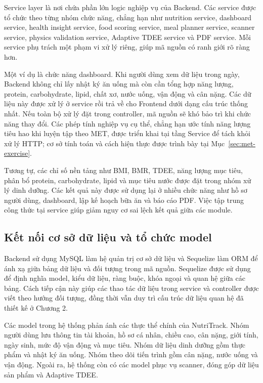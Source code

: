 \documentclass[12pt, a4paper]{report}
\begin{document}
Service layer là nơi chứa phần lớn logic nghiệp vụ của Backend. Các service được tổ chức theo từng nhóm chức năng, chẳng hạn như nutrition service, dashboard service, health insight service, food scoring service, meal planner service, scanner service, physics validation service, Adaptive TDEE service và PDF service. Mỗi service phụ trách một phạm vi xử lý riêng, giúp mã nguồn có ranh giới rõ ràng hơn.

Một ví dụ là chức năng dashboard. Khi người dùng xem dữ liệu trong ngày, Backend không chỉ lấy nhật ký ăn uống mà còn cần tổng hợp năng lượng, protein, carbohydrate, lipid, chất xơ, nước uống, vận động và cân nặng. Các dữ liệu này được xử lý ở service rồi trả về cho Frontend dưới dạng cấu trúc thống nhất. Nếu toàn bộ xử lý đặt trong controller, mã nguồn sẽ khó bảo trì khi chức năng thay đổi. Các phép tính nghiệp vụ cụ thể, chẳng hạn ước tính năng lượng tiêu hao khi luyện tập theo MET, được triển khai tại tầng Service để tách khỏi xử lý HTTP; cơ sở tính toán và cách hiện thực được trình bày tại Mục~\ref{sec:met-exercise}.

Tương tự, các chỉ số nền tảng như BMI, BMR, TDEE, năng lượng mục tiêu, phân bổ protein, carbohydrate, lipid và mục tiêu nước được đặt trong nhóm xử lý dinh dưỡng. Các kết quả này được sử dụng lại ở nhiều chức năng như hồ sơ người dùng, dashboard, lập kế hoạch bữa ăn và báo cáo PDF. Việc tập trung công thức tại service giúp giảm nguy cơ sai lệch kết quả giữa các module.

\subsection{Kết nối cơ sở dữ liệu và tổ chức model}Backend sử dụng MySQL làm hệ quản trị cơ sở dữ liệu và Sequelize làm ORM để ánh xạ giữa bảng dữ liệu và đối tượng trong mã nguồn. Sequelize được sử dụng để định nghĩa model, kiểu dữ liệu, ràng buộc, khóa ngoại và quan hệ giữa các bảng. Cách tiếp cận này giúp các thao tác dữ liệu trong service và controller được viết theo hướng đối tượng, đồng thời vẫn duy trì cấu trúc dữ liệu quan hệ đã thiết kế ở Chương 2.

Các model trong hệ thống phản ánh các thực thể chính của NutriTrack. Nhóm người dùng lưu thông tin tài khoản, hồ sơ cá nhân, chiều cao, cân nặng, giới tính, ngày sinh, mức độ vận động và mục tiêu. Nhóm dữ liệu dinh dưỡng gồm thực phẩm và nhật ký ăn uống. Nhóm theo dõi tiến trình gồm cân nặng, nước uống và vận động. Ngoài ra, hệ thống còn có các model phục vụ scanner, đóng góp dữ liệu sản phẩm và Adaptive TDEE.
\end{document}
